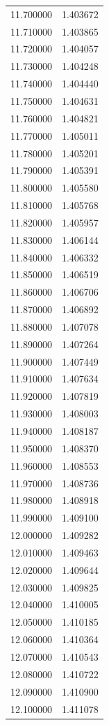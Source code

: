 \begin{tabular}{rr}
11.700000 & 1.403672 \\
11.710000 & 1.403865 \\
11.720000 & 1.404057 \\
11.730000 & 1.404248 \\
11.740000 & 1.404440 \\
11.750000 & 1.404631 \\
11.760000 & 1.404821 \\
11.770000 & 1.405011 \\
11.780000 & 1.405201 \\
11.790000 & 1.405391 \\
11.800000 & 1.405580 \\
11.810000 & 1.405768 \\
11.820000 & 1.405957 \\
11.830000 & 1.406144 \\
11.840000 & 1.406332 \\
11.850000 & 1.406519 \\
11.860000 & 1.406706 \\
11.870000 & 1.406892 \\
11.880000 & 1.407078 \\
11.890000 & 1.407264 \\
11.900000 & 1.407449 \\
11.910000 & 1.407634 \\
11.920000 & 1.407819 \\
11.930000 & 1.408003 \\
11.940000 & 1.408187 \\
11.950000 & 1.408370 \\
11.960000 & 1.408553 \\
11.970000 & 1.408736 \\
11.980000 & 1.408918 \\
11.990000 & 1.409100 \\
12.000000 & 1.409282 \\
12.010000 & 1.409463 \\
12.020000 & 1.409644 \\
12.030000 & 1.409825 \\
12.040000 & 1.410005 \\
12.050000 & 1.410185 \\
12.060000 & 1.410364 \\
12.070000 & 1.410543 \\
12.080000 & 1.410722 \\
12.090000 & 1.410900 \\
12.100000 & 1.411078 \\

\end{tabular}
